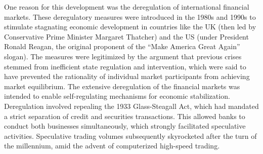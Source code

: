 \documentclass[
  a4paper,
  openany]{book}
\begin{document}
One reason for this development was the deregulation of international
financial markets. These deregulatory measures were introduced in the
1980s and 1990s to stimulate stagnating economic development in
countries like the UK (then led by Conservative Prime Minister Margaret
Thatcher) and the US (under President Ronald Reagan, the original
proponent of the ``Make America Great Again'' slogan). The measures were
legitimized by the argument that previous crises stemmed from
inefficient state regulation and intervention, which were said to have
prevented the rationality of individual market participants from
achieving market equilibrium. The extensive deregulation of the
financial markets was intended to enable self-regulating mechanisms for
economic stabilization. Deregulation involved repealing the 1933
Glass-Steagall Act, which had mandated a strict separation of credit and
securities transactions. This allowed banks to conduct both businesses
simultaneously, which strongly facilitated speculative activities.
Speculative trading volumes subsequently skyrocketed after the turn of
the millennium, amid the advent of computerized high-speed trading.
\end{document}
